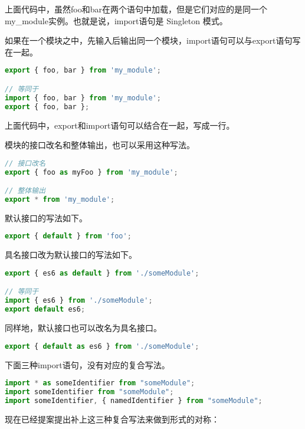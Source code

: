 上面代码中，虽然foo和bar在两个语句中加载，但是它们对应的是同一个my\_module实例。也就是说，import语句是 Singleton 模式。


如果在一个模块之中，先输入后输出同一个模块，import语句可以与export语句写在一起。


\begin{lstlisting}[language=JavaScript]
export { foo, bar } from 'my_module';

// 等同于
import { foo, bar } from 'my_module';
export { foo, bar };
\end{lstlisting}

上面代码中，export和import语句可以结合在一起，写成一行。

模块的接口改名和整体输出，也可以采用这种写法。

\begin{lstlisting}[language=JavaScript]
// 接口改名
export { foo as myFoo } from 'my_module';

// 整体输出
export * from 'my_module';
\end{lstlisting}


默认接口的写法如下。

\begin{lstlisting}[language=JavaScript]
export { default } from 'foo';
\end{lstlisting}

具名接口改为默认接口的写法如下。


\begin{lstlisting}[language=JavaScript]
export { es6 as default } from './someModule';

// 等同于
import { es6 } from './someModule';
export default es6;
\end{lstlisting}

同样地，默认接口也可以改名为具名接口。


\begin{lstlisting}[language=JavaScript]
export { default as es6 } from './someModule';
\end{lstlisting}

下面三种import语句，没有对应的复合写法。




\begin{lstlisting}[language=JavaScript]
import * as someIdentifier from "someModule";
import someIdentifier from "someModule";
import someIdentifier, { namedIdentifier } from "someModule";
\end{lstlisting}


现在已经提案提出补上这三种复合写法来做到形式的对称：

